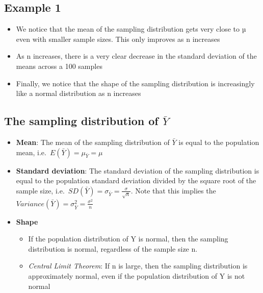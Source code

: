 \documentclass[
]{book}
\providecommand{\tightlist}{%
  \setlength{\itemsep}{0pt}\setlength{\parskip}{0pt}}
\begin{document}
\hypertarget{example-1}{%
\subsection{Example 1}\label{example-1}}

\begin{itemize}
\tightlist
\item
  We notice that the mean of the sampling distribution gets very close to µ even with smaller sample sizes. This only improves as n increases
\item
  As n increases, there is a very clear decrease in the standard deviation of the means across a 100 samples
\item
  Finally, we notice that the shape of the sampling distribution is increasingly like a normal distribution as n increases
\end{itemize}

\hypertarget{the-sampling-distribution-of-bar-y-1}{%
\subsection{\texorpdfstring{The sampling distribution of \(\bar Y\)}{The sampling distribution of \textbackslash bar Y}}\label{the-sampling-distribution-of-bar-y-1}}

\begin{itemize}
\tightlist
\item
  \textbf{Mean}: The mean of the sampling distribution of \(\bar Y\) is equal to the population mean, i.e.~\(E(\bar Y)=\mu_{\bar Y}=\mu\)
\item
  \textbf{Standard deviation}: The standard deviation of the sampling distribution is equal to the population standard deviation divided by the square root of the sample size, i.e.~\(SD(\bar Y)=\sigma_{\bar Y}=\frac{\sigma}{\sqrt n}\). Note that this implies the \(Variance(\bar Y)=\sigma^2_{\bar Y}=\frac{\sigma^2}{n}\)
\item
  \textbf{Shape}

  \begin{itemize}
  \tightlist
  \item
    If the population distribution of Y is normal, then the sampling distribution is normal, regardless of the sample size n.~
  \item
    \emph{Central Limit Theorem}: If n is large, then the sampling distribution is approximately normal, even if the population distribution of Y is not normal
  \end{itemize}
\end{itemize}
\end{document}
